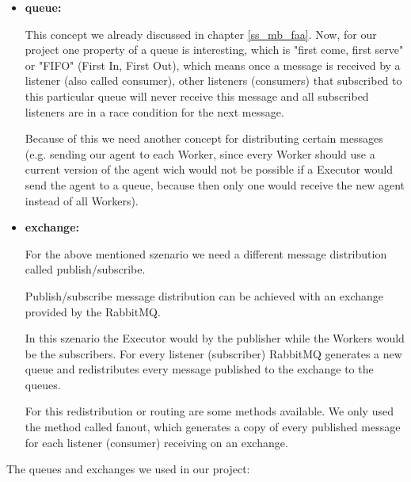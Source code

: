 \begin{itemize}[label={}]

  \item \textbf{queue:}

        This concept we already discussed in chapter
        \ref{ss_mb_faa}. Now, for our project one property
        of a queue is interesting, which is "first come,
        first serve" or "FIFO" (First In, First Out), which
        means once a message is received by a listener
        (also called consumer), other listeners (consumers)
        that subscribed to this particular queue will never
        receive this message and all subscribed listeners
        are in a race condition for the next message.

        Because of this we need another concept for
        distributing certain messages (e.g. sending our
        agent to each Worker, since every Worker should use
        a current version of the agent wich would not be
        possible if a Executor would send the agent to a
        queue, because then only one would receive the new
        agent instead of all Workers).

  \item \textbf{exchange:}

        For the above mentioned szenario we need a
        different message distribution called
        publish/subscribe.

        Publish/subscribe message distribution can be
        achieved with an exchange provided by the RabbitMQ.

        In this szenario the Executor would by the
        publisher while the Workers would be the
        subscribers. For every listener (subscriber)
        RabbitMQ generates a new queue and redistributes
        every message published to the exchange to the
        queues.

        For this redistribution or routing are some methods
        available. We only used the method called fanout,
        which generates a copy of every published message
        for each listener (consumer) receiving on an
        exchange.

\end{itemize}



The queues and exchanges we used in our project:


